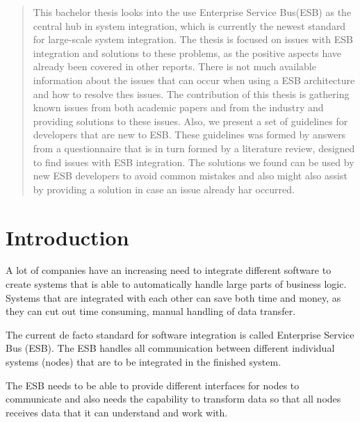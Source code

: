 \documentclass{llncs}
\begin{document}


\begin{abstract}
This bachelor thesis looks into the use Enterprise Service Bus(ESB) as the central hub in system integration, which is currently the newest standard for large-scale system integration. The thesis is focused on issues with ESB integration and solutions to these problems, as the positive aspects have already been covered in other reports.
There is not much available information about the issues that can occur when using a ESB architecture and how to resolve thes issues. 
The contribution of this thesis is gathering known issues from both academic papers and from the industry and providing solutions to these issues. Also, we present a set of guidelines for developers that are new to ESB. These guidelines was formed by answers from a questionnaire that is in turn formed by a literature review, designed to find issues with ESB integration.
The solutions we found can be used by new ESB developers to avoid common mistakes and also might also assist by providing a solution in case an issue already har occurred.

\end{abstract}

\newpage
\setcounter{tocdepth}{3}

\tableofcontents

\setcounter{page}{1}
\pagestyle{plain}

\newpage

\section{Introduction}
A lot of companies have an increasing need to integrate different software to create systems that is able to automatically handle large parts of business logic. Systems that are integrated with each other can save both time and money, as they can cut out time consuming, manual handling of data transfer.

The current de facto standard for software integration is called Enterprise Service Bus (ESB)\cite{esb}. The ESB handles all communication between different individual systems (nodes) that are to be integrated in the finished system.

The ESB needs to be able to provide different interfaces for nodes to communicate and also needs the capability to transform data so that all nodes receives data that it can understand and work with.
\end{document}
